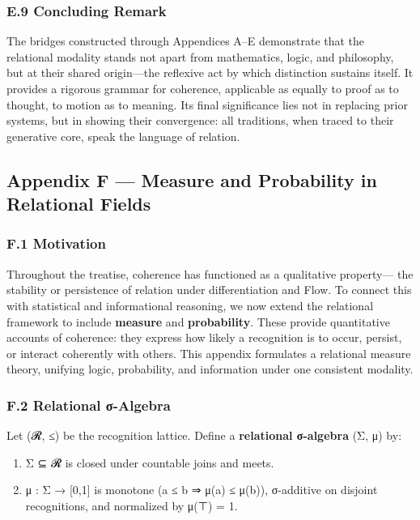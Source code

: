 \documentclass[11pt]{article}
\begin{document}
\subsubsection*{E.9 Concluding Remark}
\label{sec:org4092a9c}
The bridges constructed through Appendices A–E  
demonstrate that the relational modality stands  
not apart from mathematics, logic, and philosophy,  
but at their shared origin—the reflexive act by which distinction sustains itself.  
It provides a rigorous grammar for coherence,  
applicable as equally to proof as to thought,  
to motion as to meaning.  
Its final significance lies not in replacing prior systems,  
but in showing their convergence:  
all traditions, when traced to their generative core,  
speak the language of relation.
\subsection*{Appendix F — Measure and Probability in Relational Fields}
\label{sec:orgbf2f44b}

\subsubsection*{F.1 Motivation}
\label{sec:org052be3b}
Throughout the treatise, coherence has functioned as a qualitative property—  
the stability or persistence of relation under differentiation and Flow.  
To connect this with statistical and informational reasoning,  
we now extend the relational framework to include \textbf{measure} and \textbf{probability}.  
These provide quantitative accounts of coherence:  
they express how likely a recognition is to occur, persist, or interact coherently with others.  
This appendix formulates a relational measure theory,  
unifying logic, probability, and information under one consistent modality.
\subsubsection*{F.2 Relational σ-Algebra}
\label{sec:org4db73f2}
Let (𝓡, ≤) be the recognition lattice.  
Define a \textbf{relational σ-algebra} (Σ, μ) by:

\begin{enumerate}
\item Σ ⊆ 𝓡 is closed under countable joins and meets.
\item μ : Σ → [0,1] is monotone (a ≤ b ⇒ μ(a) ≤ μ(b)),  
σ-additive on disjoint recognitions,  
and normalized by μ(⊤) = 1.
\end{enumerate}
\end{document}

